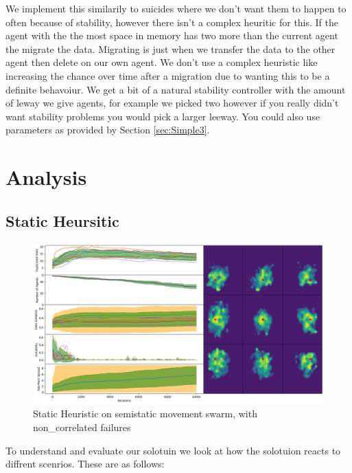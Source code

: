 \documentclass{UoYCSproject}
\begin{document}
We implement this similarily to suicides where we don't want them to happen to often because of stability, however there isn't a complex heuritic for this.
If the agent with the the most space in memory has two more than the current agent the migrate the data.
Migrating is just when we transfer the data to the other agent then delete on our own agent.
We don't use a complex heuristic like increasing the chance over time after a migration due to wanting this to be a definite behavoiur.
We get a bit of a natural stability controller with the amount of leway we give agents, for example we picked two however if you really didn't want stability problems you would pick a larger leeway.
You could also use parameters as provided by Section \ref{sec:Simple3}.



\chapter{Analysis}
\label{cha:Analysis}


\section{Static Heursitic}
\label{sec:Simple2a}

\begin{figure}[htb]
\label{fig:static_movement_non}
\begin{center}
\centering
\includegraphics[width=\linewidth]{"./Static_Heuristic/Static_Movement_non.png"}
\caption{Static Heuristic on semi\-static movement swarm, with non\_correlated failures}
\end{center}
\end{figure}

To understand and evaluate our solotuin we look at how the solotuion reacts to diffrent scenrios.
These are as follows:
\end{document}
